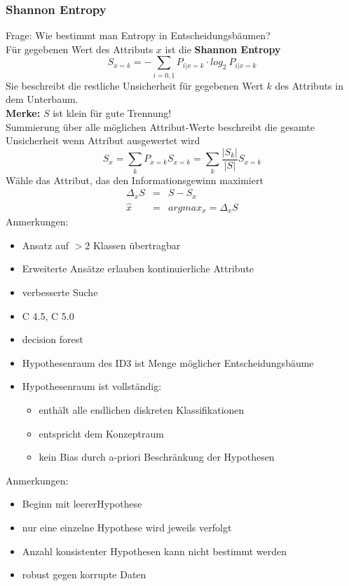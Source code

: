	\subsubsection{Shannon Entropy}
	Frage: Wie bestimmt man Entropy in Entscheidungsbäumen?\\[5pt]
	Für gegebenen Wert des Attributs $x$ ist die \textbf{Shannon Entropy}
	\begin{equation*}
		S_{x=k}=-\sum_{i=0,1}P_{i\vert x=k}\cdot log_2~P_{i\vert x=k}
	\end{equation*}
	Sie beschreibt die restliche Unsicherheit für gegebenen Wert $k$ des Attributs in dem Unterbaum.\\[5pt]
	\textbf{Merke:} $S$ ist klein für gute Trennung!\\[5pt]
	Summierung über alle möglichen Attribut-Werte beschreibt die gesamte Unsicherheit wenn Attribut ausgewertet wird
	\begin{equation*}
		S_x = \sum_k P_{x=k}S_{x=k}=\sum_k\frac{\vert S_k\vert}{\vert S\vert}S_{x=k}
	\end{equation*}
	Wähle das Attribut, das den Informationsgewinn maximiert
	\begin{eqnarray*}
		\Delta_x S &=& S-S_x\\
		\hat{x} &=& argmax_x = \Delta_x S
	\end{eqnarray*}
	Anmerkungen:
	\begin{itemize}
		\item Ansatz auf $>2$ Klassen übertragbar
		\item Erweiterte Ansätze erlauben kontinuierliche Attribute
		\item verbesserte Suche
		\item C 4.5, C 5.0
		\item decision forest
	\end{itemize}
\newpage
	\begin{itemize}
		\item Hypothesenraum des ID3 ist Menge möglicher Entscheidungsbäume
		\item Hypothesenraum ist vollständig:
		\begin{itemize}
			\item enthält alle endlichen diskreten Klassifikationen
			\item entspricht dem Konzeptraum
			\item kein Bias durch a-priori Beschränkung der Hypothesen
		\end{itemize}
	\end{itemize}
	Anmerkungen:
	\begin{itemize}
		\item Beginn mit \dq leerer\dq Hypothese
		\item nur eine einzelne Hypothese wird jeweils verfolgt
		\item Anzahl konsistenter Hypothesen kann nicht bestimmt werden
		\item robust gegen korrupte Daten
	\end{itemize}
